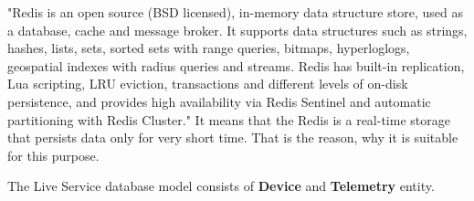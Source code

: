 "Redis is an open source (BSD licensed), in-memory data structure store, used as a database, cache and message broker.
It supports data structures such as strings, hashes, lists, sets, sorted sets with range queries, bitmaps, hyperloglogs, geospatial indexes with radius queries and streams.
Redis has built-in replication, Lua scripting, LRU eviction, transactions and different levels of on-disk persistence, and provides high availability via Redis Sentinel and automatic partitioning with Redis Cluster."\cite{redis}
It means that the Redis is a real-time storage that persists data only for very short time.
That is the reason, why it is suitable for this purpose.

The Live Service database model consists of \textbf{Device} and \textbf{Telemetry} entity.

